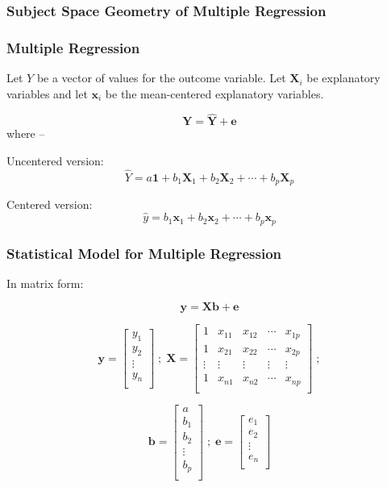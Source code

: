\documentclass{beamer}
\newcommand{\Mtx}[1]{\ensuremath{\mathbf{#1}}}
\begin{document}
\begin{frame}
  \frametitle{Subject Space Geometry of Multiple Regression}

\begin{center}

\end{center}
\end{frame}

\begin{frame}
  \frametitle{Multiple Regression}

Let $Y$ be a vector of values for the outcome variable. Let $\Mtx{X}_i$ be explanatory variables and let $\Mtx{x}_i$ be the mean-centered explanatory variables.
\medskip

$$
\Mtx{Y} = \hat{\Mtx{Y}} + \Mtx{e}
$$
where --
\bigskip

Uncentered version:
$$
\hat{Y} = a\Mtx{1} + b_1\Mtx{X}_1 + b_2\Mtx{X}_2 + \cdots + b_p\Mtx{X}_p
$$

Centered version:
$$
\hat{y} = b_1\Mtx{x}_1 + b_2\Mtx{x}_2 + \cdots + b_p\Mtx{x}_p
$$


\end{frame}
\begin{frame}
  \frametitle{Statistical Model for Multiple Regression}

In matrix form:

$$  
\Mtx{y} = \Mtx{X}\Mtx{b} + \Mtx{e}
$$

$$
\Mtx{y} = \left[ \begin{array}{c}
y_1 \\ y_2 \\ \vdots \\y_n \\
\end{array}
\right]
\;
;
\;
\Mtx{X} = \left[ \begin{array}{ccccc}
1 & x_{11} & x_{12} & \cdots & x_{1p} \\
1 & x_{21} & x_{22} & \cdots & x_{2p} \\
\vdots & \vdots & \vdots & \vdots & \vdots \\
1 & x_{n1} & x_{n2} & \cdots & x_{np} \\
\end{array}
\right]
\;
;
$$

$$
\Mtx{b} = \left[ \begin{array}{c}
a \\ b_1 \\ b_2 \\ \vdots \\ b_p \\
\end{array}
\right]
\;
;
\;
\Mtx{e} = \left[ \begin{array}{c}
e_1 \\ e_2 \\ \vdots \\e_n \\
\end{array}
\right]
$$

\end{frame}
\end{document}
